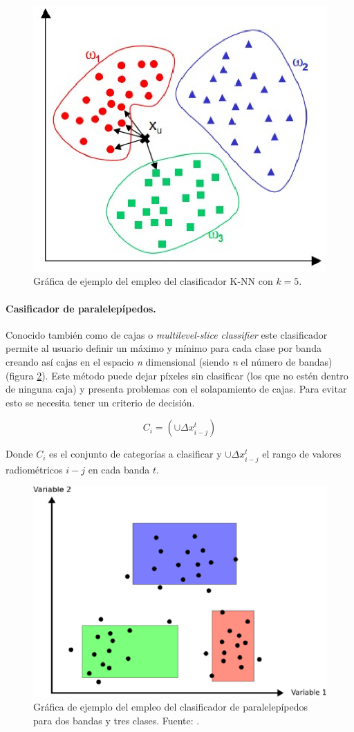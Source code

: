 \begin{figure}
	\centering
	\includegraphics[width=0.6\linewidth]{./Imagenes/KNN.eps}
	\caption[Clasificador \textit{K-Nearest Neighbor}]{Gráfica de ejemplo del empleo del clasificador K-NN con $k=5$.}
	\label{fig:KNN}
\end{figure}

\paragraph{Casificador de paralelepípedos.}
Conocido también como de cajas o \textit{multilevel-slice classifier} este clasificador permite al usuario definir un máximo y mínimo para cada clase por banda creando así cajas en el espacio \textit{n} dimensional (siendo \textit{n} el número de bandas) (figura \ref{fig:paralele}). Este método puede dejar píxeles sin clasificar (los que no estén dentro de ninguna caja) y presenta problemas con el solapamiento de cajas. Para evitar esto se necesita tener un criterio de decisión.

\begin{equation}
C_{i}=(\cup\Delta x^{t}_{i-j})
\end{equation}

Donde $C_{i}$ es el conjunto de categorías a clasificar y $\cup\Delta x^{t}_{i-j}$ el rango de valores radiométricos $i-j$ en cada banda $t$.

\begin{figure}
	\centering
	\includegraphics[width=0.6\linewidth]{./Imagenes/Paralelepipedos.eps}
	\caption[Clasificador de paralelepípedos]{Gráfica de ejemplo del empleo del clasificador de paralelepípedos para dos bandas y tres clases. Fuente: \cite{Olaya2010}.}
	\label{fig:paralele}	
\end{figure}

